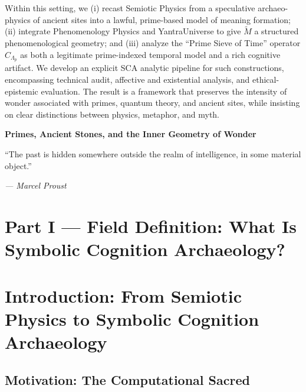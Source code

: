 \documentclass[12]{amsart}
\theoremstyle{plain}
\begin{document}
\begin{titlepage}
\begin{minipage}{0.85\textwidth}
Within this setting, we (i) recast Semiotic Physics from a speculative archaeo-physics of ancient sites into a lawful, prime-based model of meaning formation; (ii) integrate Phenomenology Physics and YantraUniverse to give $\tilde M$ a structured phenomenological geometry; and (iii) analyze the ``Prime Sieve of Time'' operator $C_{\Lambda_p}$ as both a legitimate prime-indexed temporal model and a rich cognitive artifact. We develop an explicit SCA analytic pipeline for such constructions, encompassing technical audit, affective and existential analysis, and ethical-epistemic evaluation. The result is a framework that preserves the intensity of wonder associated with primes, quantum theory, and ancient sites, while insisting on clear distinctions between physics, metaphor, and myth.

    \end{minipage}

\end{titlepage}


\clearpage
\clearpage
\thispagestyle{empty}
\begin{center}
    \Large\textbf{Primes, Ancient Stones, and the Inner Geometry of Wonder}
\end{center}

\vspace{2em}

\epigraph{“The past is hidden somewhere outside the realm of intelligence, in some material object.”
}{\textit{— Marcel Proust}}

\vspace{1em}



\section*{Part I — Field Definition: What Is Symbolic Cognition Archaeology?}

\section{Introduction: From Semiotic Physics to Symbolic Cognition Archaeology}

\subsection{Motivation: The Computational Sacred}
\end{document}
